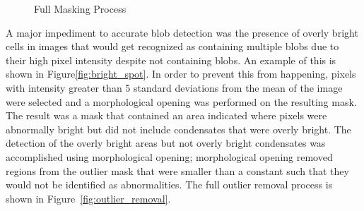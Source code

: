 \documentclass[12pt]{article}
\begin{document}
\begin{figure}[H]
{{        }
    }\hfill{
    }\caption{Full Masking Process}
    \label{fig:masking_process}
\end{figure}

A major impediment to accurate blob detection was the presence of overly bright cells in images that
would get recognized as containing multiple blobs due to their high pixel intensity despite not containing
blobs. An example of this is shown in Figure\ref{fig:bright_spot}. In order to prevent this from happening, pixels with intensity greater than 5 standard deviations
from the mean of the image were selected and a morphological opening was performed on the resulting 
mask. The result was a mask that contained an area indicated where pixels were abnormally bright 
but did not include condensates that were overly bright. The detection of the overly bright areas
but not overly bright condensates was accomplished using morphological opening; morphological
opening removed regions from the outlier mask that were smaller than a constant such that they would
not be identified as abnormalities. The full outlier removal process is 
shown in Figure~\ref{fig:outlier_removal}.
\end{document}
